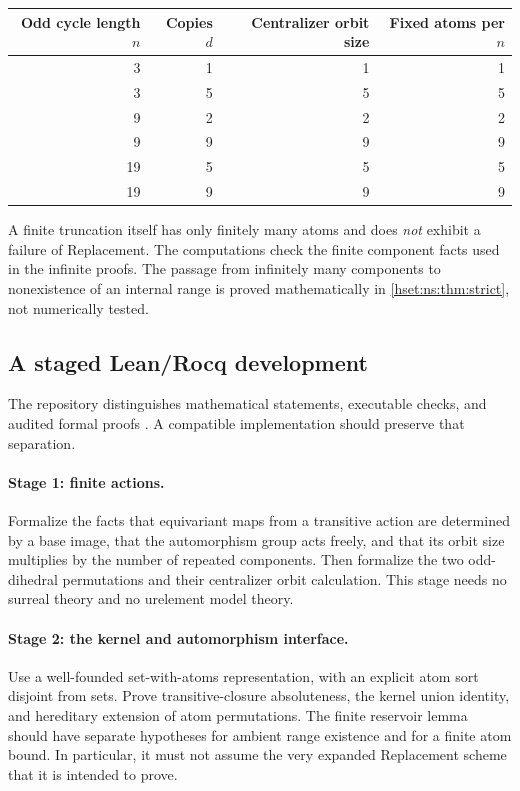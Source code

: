 \documentclass[11pt,letterpaper]{article}
\theoremstyle{definition}
\theoremstyle{remark}
\begin{document}
\begin{center}
\begin{tabular}{@{}rrrr@{}}
\toprule
Odd cycle length $n$ & Copies $d$ & Centralizer orbit size & Fixed atoms per $n$\\
\midrule
3 & 1 & 1 & 1\\
3 & 5 & 5 & 5\\
9 & 2 & 2 & 2\\
9 & 9 & 9 & 9\\
19 & 5 & 5 & 5\\
19 & 9 & 9 & 9\\
\bottomrule
\end{tabular}
\end{center}
A finite truncation itself has only finitely many atoms and does \emph{not} exhibit a failure of Replacement. The computations check the finite component facts used in the infinite proofs. The passage from infinitely many components to nonexistence of an internal range is proved mathematically in \cref{hset:ns:thm:strict}, not numerically tested.

\subsection{A staged Lean/Rocq development}
The repository distinguishes mathematical statements, executable checks, and audited formal proofs \cite{ProveItSurrealNS}. A compatible implementation should preserve that separation.

\paragraph{Stage 1: finite actions.}
Formalize the facts that equivariant maps from a transitive action are determined by a base image, that the automorphism group acts freely, and that its orbit size multiplies by the number of repeated components. Then formalize the two odd-dihedral permutations and their centralizer orbit calculation. This stage needs no surreal theory and no urelement model theory.

\paragraph{Stage 2: the kernel and automorphism interface.}
Use a well-founded set-with-atoms representation, with an explicit atom sort disjoint from sets. Prove transitive-closure absoluteness, the kernel union identity, and hereditary extension of atom permutations. The finite reservoir lemma should have separate hypotheses for ambient range existence and for a finite atom bound. In particular, it must not assume the very expanded Replacement scheme that it is intended to prove.
\end{document}
